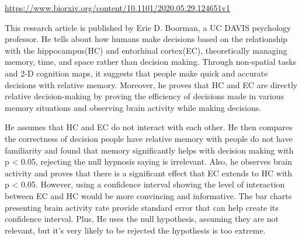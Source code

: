 \documentclass[./ProjectReport.tex]{subfiles}
\begin{document}

\begin{center}
\par
\href{https://www.biorxiv.org/content/10.1101/2020.05.29.124651v1}{https://www.biorxiv.org/content/10.1101/2020.05.29.124651v1}
\end{center}

\setlength{\parindent}{10ex}
This research article is published by Erie D. Boorman, a UC DAVIS psychology professor. He tells about how humans
 make decisions based on the relationship with the hippocampus(HC) and entorhinal cortex(EC), theoretically managing
 memory, time, and space rather than decision making. Through non-spatial tasks and 2-D cognition maps, it suggests
 that people make quick and accurate decisions with relative memory. Moreover, he proves that HC and EC are directly
 relative decision-making by proving the efficiency of decisions made in various memory situations and observing brain
 activity while making decisions.
\par
He assumes that HC and EC do not interact with each other. He then compares the correctness of decision people have
 relative memory with people do not have familiarity and found that memory significantly helps with decision making
 with p < 0.05, rejecting the null hypnosis saying is irrelevant. Also, he observes brain activity and proves that
 there is a significant effect that EC extends to HC with p < 0.05. However, using a confidence interval showing the
 level of interaction between EC and HC would be more convincing and informative. The bar charts presenting brain
 activity rate provide standard error that can help create its confidence interval. Plus, He uses the null hypothesis,
 assuming they are not relevant, but it’s very likely to be rejected the hypothesis is too extreme.
\end{document}

